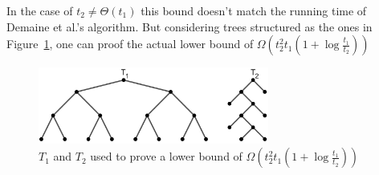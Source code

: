 In the case of $t_2 \neq \Theta(t_1)$ this bound doesn't match the running time of Demaine et al.'s algorithm. But considering trees structured as the ones in Figure~\ref{fig:m^2nlogm/n}, one can proof the actual lower bound of  $\Omega(t_2^2t_1(1+\log \frac{t_1}{t_2}))$
\begin{figure}[]
	\centering
	\includegraphics[height=2.5cm]{figures/O(m^2nlogn_m).JPG}
	\caption{$T_1$ and $T_2$ used to prove a lower bound of $\Omega(t_2^2t_1(1+\log \frac{t_1}{t_2}))$}
\label{fig:m^2nlogm/n}
\end{figure}